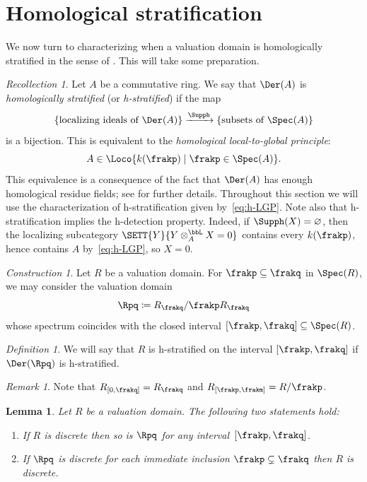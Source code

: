 \documentclass{amsart}
\numberwithin{equation}{section}%
\newtheorem{Lem}[equation]{Lemma}
\theoremstyle{remark}
\newtheorem{Def}[equation]{Definition}
\newtheorem{Cons}[equation]{Construction}
\newtheorem{Rem}[equation]{Remark}
\newtheorem{Rec}[equation]{Recollection}
\newcounter{enum-resume-hack}
\renewcommand{\emptyset}{\varnothing}
\begin{document}
\section{Homological stratification}

We now turn to characterizing when a valuation domain is homologically stratified in the sense of \cite{BarthelHeardSandersZou26}. This will take some preparation.

\begin{Rec}
	Let $A$ be a commutative ring. We say that $\Der(A)$ is \emph{homologically stratified} (or \emph{h-stratified}) if the map
	\[
		\{\text{localizing ideals of $\Der(A)$}\} \xrightarrow{\Supph} \{\text{subsets of $\Spec(A)$}\}
	\]
	is a bijection. This is equivalent to the \emph{homological local-to-global principle}:
	\begin{equation}\label{eq:h-LGP}
		A \in \Loco{k(\frakp) \mid \frakp \in \Spec(A)}.
	\end{equation}
	This equivalence is a consequence of the fact that $\Der(A)$ has enough homological residue fields; see \cite[Corollary~4.9 and Example~4.10]{BarthelHeardSandersZou26} for further details. Throughout this section we will use the characterization of h-stratification given by~\eqref{eq:h-LGP}. Note also that h-stratification implies the h-detection property. Indeed, if $\Supph(X) = \emptyset$, then the localizing subcategory $\SETT{Y}{Y \otimes_A^{\bbL} X = 0}$ contains every $k(\frakp)$, hence contains $A$ by~\eqref{eq:h-LGP}, so $X = 0$.
\end{Rec}

\begin{Cons}
	Let $R$ be a valuation domain. For $\frakp \subseteq \frakq$ in $\Spec(R)$, we may consider the valuation domain
	\[
		\Rpq \coloneqq R_\frakq/\frakp R_\frakq
	\]
	whose spectrum coincides with the closed interval $[\frakp,\frakq] \subseteq \Spec(R)$.
\end{Cons}

\begin{Def}
	We will say that $R$ is h-stratified on the interval $[\frakp,\frakq]$ if $\Der(\Rpq)$ is h-stratified.
\end{Def}

\begin{Rem}
	Note that $R_{[0,\frakq]} = R_{\frakq}$ and $R_{[\frakp,\frakm]} = R/\frakp$.
\end{Rem}

\begin{Lem}\label{lem:discrete-interval}
	Let $R$ be a valuation domain. The following two statements hold:
	\begin{enumerate}
		\item If $R$ is discrete then so is $\Rpq$ for any interval~$[\frakp,\frakq]$.
		\item If $\Rpq$ is discrete for each immediate inclusion $\frakp \subsetneq \frakq$ then $R$ is discrete.
	\end{enumerate}
\end{Lem}
\end{document}
